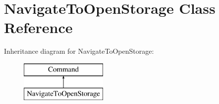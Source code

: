 \hypertarget{classNavigateToOpenStorage}{\section{Navigate\-To\-Open\-Storage Class Reference}
\label{classNavigateToOpenStorage}
}
Inheritance diagram for Navigate\-To\-Open\-Storage\-:\begin{figure}[H]
\begin{center}
\leavevmode
\includegraphics[height=2.000000cm]{classNavigateToOpenStorage}
\end{center}
\end{figure}
